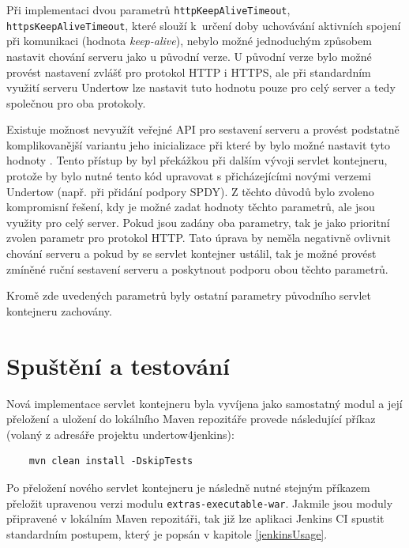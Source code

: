         
        Při implementaci dvou parametrů \texttt{httpKeepAliveTimeout}, \texttt{httpsKeepAliveTimeout}, které slouží 
        k~určení doby uchovávání aktivních spojení při komunikaci (hodnota \emph{keep-alive}), nebylo možné jednoduchým způsobem
        nastavit chování serveru jako u původní verze. U původní verze bylo možné provést nastavení zvlášť pro
        protokol HTTP i HTTPS, ale při standardním využití serveru Undertow lze nastavit tuto hodnotu pouze pro celý
        server a tedy společnou pro oba protokoly. 
        
        Existuje možnost nevyužít veřejné API pro sestavení serveru 
        a provést podstatně komplikovanější variantu jeho inicializace při které by bylo možné nastavit tyto hodnoty \cite{undertowAssembly}.
        Tento přístup by byl překážkou při dalším vývoji servlet kontejneru, protože by bylo nutné tento
        kód upravovat s přicházejícími novými verzemi Undertow (např. při přidání podpory SPDY). 
        Z těchto důvodů bylo zvoleno kompromisní řešení, kdy je možné zadat hodnoty těchto parametrů, ale
        jsou využity pro celý server. Pokud jsou zadány oba parametry, tak je jako prioritní zvolen
        parametr pro protokol HTTP. Tato úprava by neměla negativně ovlivnit chování serveru a pokud
        by se servlet kontejner ustálil, tak je možné provést zmíněné ruční sestavení serveru a poskytnout
        podporu obou těchto parametrů.
          
        Kromě zde uvedených parametrů byly ostatní parametry původního servlet kontejneru zachovány.



    \section{Spuštění a testování}
        Nová implementace servlet kontejneru byla vyvíjena jako samostatný modul a její přeložení
        a uložení do lokálního Maven repozitáře provede následující příkaz (volaný z adresáře projektu
        undertow4jenkins):

\begin{verbatim}
    mvn clean install -DskipTests
\end{verbatim}
    
    Po přeložení nového servlet kontejneru je následně nutné stejným příkazem přeložit upravenou
    verzi modulu \texttt{extras-executable-war}. Jakmile jsou moduly připravené
    v lokálním Maven repozitáři, tak již lze aplikaci Jenkins CI spustit standardním postupem,
    který je popsán v kapitole \ref{jenkinsUsage}.


